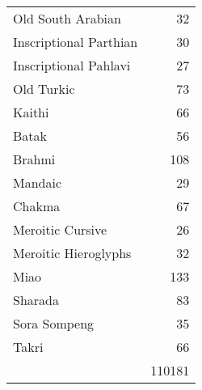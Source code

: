 \begin{longtable}{lr}
Old South Arabian	&32\\
Inscriptional Parthian	 &30\\
Inscriptional Pahlavi	&27\\
Old Turkic	&73\\
Kaithi	 &66\\
Batak	 &56\\
Brahmi	 &108\\
Mandaic	&29\\
Chakma	&67\\
Meroitic Cursive	&26\\
Meroitic Hieroglyphs	&32\\
Miao	&133\\
Sharada	&83\\
Sora Sompeng	&35\\
Takri	&66\\
	
	&110181\\
\end{longtable}

